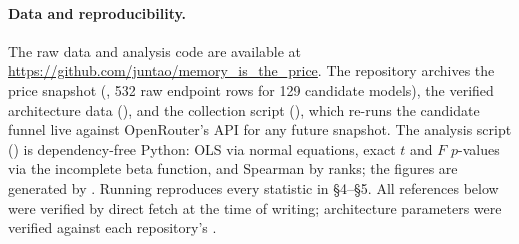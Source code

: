 \documentclass[11pt]{article}
\begin{document}
\paragraph{Data and reproducibility.}
The raw data and analysis code are available at
\url{https://github.com/juntao/memory_is_the_price}. The repository
archives the price snapshot (, 532 raw
endpoint rows for 129 candidate models), the verified architecture data
(), and the collection script
(), which re-runs the candidate funnel live
against OpenRouter's API for any future snapshot. The analysis script ()
is dependency-free Python: OLS via normal equations, exact $t$ and $F$
$p$-values via the incomplete beta function, and Spearman by ranks; the
figures are generated by . Running 
reproduces every statistic in \S4--\S5. All references below were verified by direct fetch at the
time of writing; architecture parameters were verified against each
repository's .
\end{document}
